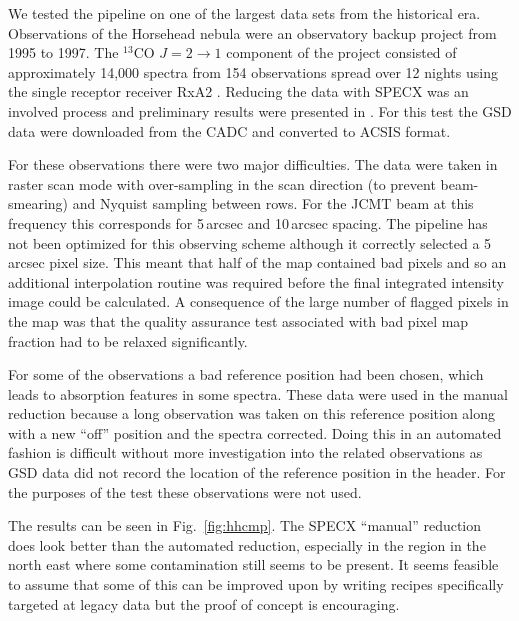 \documentclass[final,authoryear,5p,times,twocolumn]{elsarticle}
\begin{document}
We tested the pipeline on one of the largest data sets from the
historical era. Observations of the Horsehead nebula were an
observatory backup project from 1995 to 1997. The $^{13}$CO
$J=2\rightarrow 1$ component of the project consisted of approximately
14,000 spectra from 154 observations spread over 12 nights using the
single receptor receiver RxA2 \citep{1992IJIMW..13..647D}. Reducing
the data with SPECX was an involved process and preliminary results
were presented in \citet{2001AAS...19915601S}. For this test the GSD data were
downloaded from the CADC and converted to ACSIS format.

For these observations there were two major difficulties. The data
were taken in raster scan mode with over-sampling in the scan
direction (to prevent beam-smearing) and Nyquist sampling between
rows. For the JCMT beam at this frequency this corresponds for
5\,arcsec and 10\,arcsec spacing. The pipeline has not been optimized
for this observing scheme although it correctly selected a 5\,arcsec
pixel size. This meant that half of the map contained bad pixels and
so an additional interpolation routine was required before the final
integrated intensity image could be calculated. A consequence of the
large number of flagged pixels in the map was that the quality
assurance test associated with bad pixel map fraction had to be
relaxed significantly.

For some of the observations a bad reference position had been chosen,
which leads to absorption features in some spectra. These data were
used in the manual reduction because a long observation was taken on
this reference position along with a new ``off'' position and the
spectra corrected. Doing this in an automated fashion is difficult
without more investigation into the related observations as GSD data
did not record the location of the reference position in the
header. For the purposes of the test these observations were not used.

The results can be seen in Fig.\ \ref{fig:hhcmp}. The SPECX ``manual''
reduction does look better than the automated reduction, especially in
the region in the north east where some contamination still seems to
be present. It seems feasible to assume that some of this can be
improved upon by writing recipes specifically targeted at legacy data
but the proof of concept is encouraging.
\end{document}
